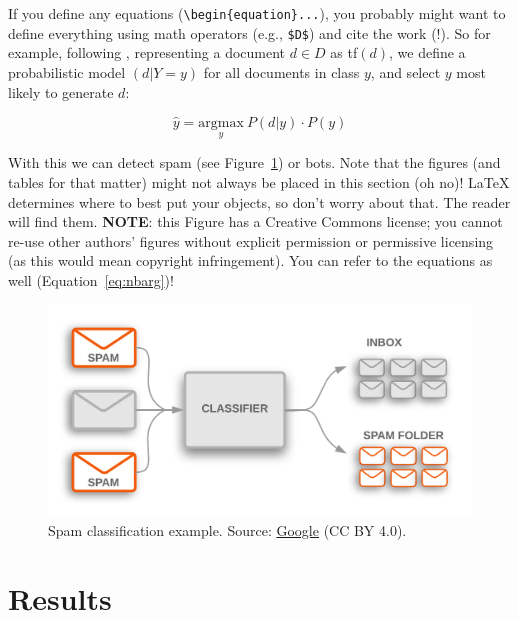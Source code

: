 \documentclass[11pt, a4paper]{article}
\begin{document}
If you define any equations (\verb|\begin{equation}...|), you probably might want to define everything using math operators (e.g., \verb|$D$|) and cite the work (!). So for example, following \cite{lewis1994sequential}, representing a document $d \in D$ as tf$(d)$, we define a probabilistic model $(d | Y = y)$ for all documents in class $y$, and select $y$ most likely to generate $d$:

\begin{equation} \label{eq:nbarg}
    \hat{y} = \underset{y}{\mathrm{argmax}} \ P(d | y) \cdot P(y)
\end{equation}

With this we can detect spam (see Figure~\ref{fig:spam}) or bots.  Note that the figures (and tables for that matter) might not always be placed in this section (oh no)! \LaTeX{} determines where to best put your objects, so don't worry about that. The reader will find them. \textbf{NOTE}: this Figure has a Creative Commons license; you cannot re-use other authors' figures without explicit permission or permissive licensing (as this would mean copyright infringement). You can refer to the equations as well (Equation~\ref{eq:nbarg})!

\begin{figure}
    \centering
    \includegraphics[width=\textwidth]{spam.png}
    \caption{Spam classification example. Source: \href{https://developers.google.com/machine-learning/guides/text-classification}{Google} (CC BY 4.0).}
    \label{fig:spam}
\end{figure}

\section{Results}
\end{document}
